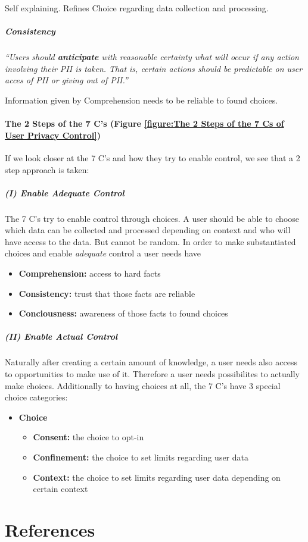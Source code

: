 Self explaining. Refines Choice regarding data collection and
processing.

\subparagraph{Consistency}

\emph{``Users should \textbf{anticipate} with reasonable certainty what
will occur if any action involving their PII is taken. That is, certain
actions should be predictable on user acces of PII or giving out of
PII.''}

Information given by Comprehension needs to be reliable to found
choices.

\paragraph{The 2 Steps of the 7 C's (Figure \ref{figure:The 2 Steps of the 7 Cs of User Privacy Control})}

If we look closer at the 7 C's and how they try to enable control, we
see that a 2 step approach is taken:



\subparagraph{(I) Enable \emph{Adequate} Control}

The 7 C's try to enable control through choices. A user should be able
to choose which data can be collected and processed depending on context
and who will have access to the data. But cannot be random. In order to
make substantiated choices and enable \emph{adequate} control a user
needs have

\begin{itemize}
\itemsep1pt\parskip0pt
\item
  \textbf{Comprehension:} access to hard facts
\item
  \textbf{Consistency:} trust that those facts are reliable
\item
  \textbf{Conciousness:} awareness of those facts to found choices
\end{itemize}

\subparagraph{(II) Enable \emph{Actual} Control}

Naturally after creating a certain amount of knowledge, a user needs
also access to opportunities to make use of it. Therefore a user needs
possibilites to actually make choices. Additionally to having choices at
all, the 7 C's have 3 special choice categories:

\begin{itemize}
\itemsep1pt\parskip0pt
\item
  \textbf{Choice}
  \begin{itemize}
  \item
    \textbf{Consent:} the choice to opt-in
  \item
    \textbf{Confinement:} the choice to set limits regarding user data
  \item
    \textbf{Context:} the choice to set limits regarding user data
    depending on certain context
  \end{itemize}

\end{itemize}

\section{References}
